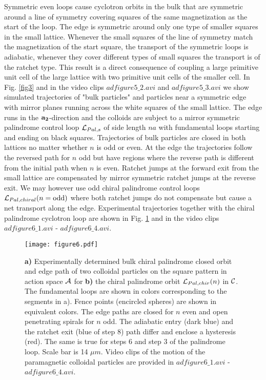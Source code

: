 \documentclass[12pt]{iopart}
\begin{document}
Symmetric even loops cause cyclotron orbits in the bulk that are symmetric around a line of symmetry covering squares of the same magnetization as the start of the loop. The edge is symmetric around only one type of smaller squares in the small lattice. Whenever the
small squares of the line of symmetry match the magnetization of the start square, the transport of the symmetric loops
is adiabatic, whenever they cover different types of small squares the transport is of the ratchet type.  This result is
a direct consequence of coupling a large primitive unit cell of the large lattice with two primitive unit cells of the smaller
cell. In Fig. \ref{fig3} and in the video clips $adfigure5\_2.avi$ and $adfigure5\_3.avi$ we show simulated trajectories of "bulk
particles" and particles near a symmetric edge with mirror planes running across the white squares of the small lattice. The
edge  runs in the $\bf a_2$-direction and the colloids are subject to a mirror symmetric palindrome control loop
${\cal L}_{Pal,s}$ of side length $na$ with fundamental loops starting and ending on black squares. Trajectories of bulk
particles are closed in both lattices no matter whether $n$ is odd or even. At the edge the trajectories follow the reversed
path for $n$ odd but have regions where the reverse path is different from the initial path when $n$ is even. Ratchet jumps
at the forward exit from the small lattice are compensated by mirror symmetric ratchet jumps at the reverse exit. We may
however use odd chiral palindrome control loops ${\cal L}_{Pal,chiral}(n=\textrm{odd})$ where both ratchet jumps do not
compensate but cause a net transport along the edge. Experimental trajectories together with the chiral palindrome cyclotron
loop are shown in Fig. \ref{fig4} and in the video clips $adfigure6\_1.avi$ -  $adfigure6\_4.avi$.

\begin{figure}
	\texttt{[image: figure6.pdf]}
	\caption{ {\bf a)} Experimentally determined bulk chiral palindrome closed orbit and edge path of two colloidal particles on the square pattern in action space $\cal A$ for {\bf b)} the chiral palindrome orbit ${\cal L}_{Pal,chir}(n)$ in $\cal C$. The fundamental loops are shown in colors corresponding to the segments in a). Fence points (encircled spheres) are shown in equivalent colors. The edge paths are closed for $n$ even and open penetrating spirals for $n$ odd. The adiabatic entry (dark blue) and the ratchet exit (blue of step 8) path differ and enclose a hysteresis (red). The same is true for steps 6 and step 3 of the palindrome loop. Scale bar is 14 $\mu m$. Video clips of the motion of the paramagnetic colloidal particles are provided in $adfigure6\_1.avi$ -  $adfigure6\_4.avi$.}
	\label{fig4}
\end{figure}
\end{document}
